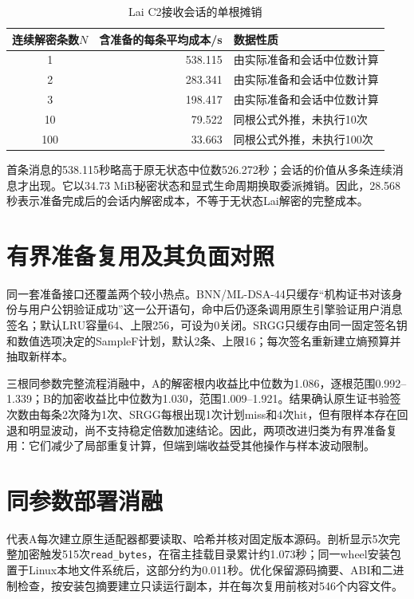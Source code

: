 \documentclass[UTF8,a4paper,12pt,oneside,openany,fontset=fandol]{ctexrep}
\begin{document}
\begin{table}[htbp]
\centering
\small
\caption{Lai C2接收会话的单根摊销}
\label{tab:lai-amortization}
\begin{tabular}{@{}crl@{}}
\toprule
\rowcolor{black!8} 连续解密条数$N$ & 含准备的每条平均成本/s & 数据性质 \\
\midrule
1 & 538.115 & 由实际准备和会话中位数计算 \\
2 & 283.341 & 由实际准备和会话中位数计算 \\
3 & 198.417 & 由实际准备和会话中位数计算 \\
10 & 79.522 & 同根公式外推，未执行10次 \\
100 & 33.663 & 同根公式外推，未执行100次 \\
\bottomrule
\end{tabular}
\end{table}

首条消息的538.115秒略高于原无状态中位数526.272秒；会话的价值从多条连续消息才出现。它以34.73 MiB秘密状态和显式生命周期换取委派摊销。因此，28.568秒表示准备完成后的会话内解密成本，不等于无状态Lai解密的完整成本。

\section{有界准备复用及其负面对照}
同一套准备接口还覆盖两个较小热点。BNN/ML-DSA-44只缓存“机构证书对该身份与用户公钥验证成功”这一公开语句，命中后仍逐条调用原生引擎验证用户消息签名；默认LRU容量64、上限256，可设为0关闭。SRGG只缓存由同一固定签名钥和数值选项决定的SampleF计划，默认2条、上限16；每次签名重新建立熵预算并抽取新样本。

三根同参数完整流程消融中，A的解密根内收益比中位数为1.086，逐根范围0.992--1.339；B的加密收益比中位数为1.030，范围1.009--1.921。结果确认原生证书验签次数由每条2次降为1次、SRGG每根出现1次计划miss和4次hit，但有限样本存在回退和明显波动，尚不支持稳定倍数加速结论。因此，两项改进归类为有界准备复用：它们减少了局部重复计算，但端到端收益受其他操作与样本波动限制。

\section{同参数部署消融}
代表A每次建立原生适配器都要读取、哈希并核对固定版本源码。剖析显示5次完整加密触发515次\texttt{read\_bytes}，在宿主挂载目录累计约1.073秒；同一wheel安装包置于Linux本地文件系统后，这部分约为0.011秒。优化保留源码摘要、ABI和二进制检查，按安装包摘要建立只读运行副本，并在每次复用前核对546个内容文件。
\end{document}
